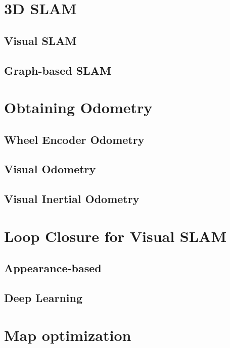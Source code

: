 \section{3D SLAM}

\subsection{Visual SLAM}

\subsection{Graph-based SLAM}


\section{Obtaining Odometry}

\subsection{Wheel Encoder Odometry}

\subsection{Visual Odometry}

\subsection{Visual Inertial Odometry}


\section{Loop Closure for Visual SLAM}

\subsection{Appearance-based}

\subsection{Deep Learning}


\section{Map optimization}



\filbreak